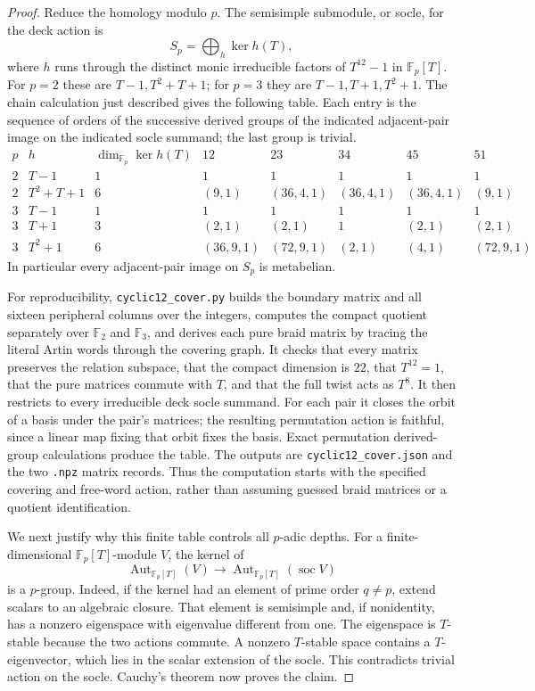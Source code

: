 \begin{proof}
Reduce the homology modulo $p$. The semisimple submodule, or socle,
for the deck action is
\[
 S_p=\bigoplus_h\ker h(T),
\]
where $h$ runs through the distinct monic irreducible factors of
$T^{12}-1$ in $\mathbb F_p[T]$. For $p=2$ these are
$T-1,T^2+T+1$; for $p=3$ they are $T-1,T+1,T^2+1$.
The chain calculation just described gives the following table. Each
entry is the sequence of orders of the successive derived groups of
the indicated adjacent-pair image on the indicated socle summand;
the last group is trivial.
\[
\begin{array}{c|c|c|ccccc}
 p&h&\dim_{\mathbb F_p}\ker h(T)&12&23&34&45&51\\\hline
2&T-1&1&1&1&1&1&1\\
2&T^2+T+1&6&(9,1)&(36,4,1)&(36,4,1)&(36,4,1)&(9,1)\\
3&T-1&1&1&1&1&1&1\\
3&T+1&3&(2,1)&(2,1)&1&(2,1)&(2,1)\\
3&T^2+1&6&(36,9,1)&(72,9,1)&(2,1)&(4,1)&(72,9,1)
\end{array}
\]
In particular every adjacent-pair image on $S_p$ is metabelian.

For reproducibility, \texttt{cyclic12\_cover.py} builds the boundary
matrix and all sixteen peripheral columns over the integers, computes
the compact quotient separately over $\mathbb F_2$ and $\mathbb F_3$,
and derives each pure braid matrix by tracing the literal Artin words
through the covering graph. It checks that every matrix preserves the
relation subspace, that the compact dimension is $22$, that $T^{12}=1$,
that the pure matrices commute with $T$, and that the full twist acts
as $T^8$. It then restricts to every irreducible deck socle summand.
For each pair it closes the orbit of a basis under the pair's matrices;
the resulting permutation action is faithful, since a linear map
fixing that orbit fixes the basis. Exact permutation derived-group
calculations produce the table. The outputs are
\texttt{cyclic12\_cover.json} and the two \texttt{.npz} matrix records.
Thus the computation starts with the specified covering and free-word
action, rather than assuming guessed braid matrices or a quotient
identification.

We next justify why this finite table controls all $p$-adic depths.
For a finite-dimensional $\mathbb F_p[T]$-module $V$, the kernel of
\[
 \operatorname{Aut}_{\mathbb F_p[T]}(V)
 \longrightarrow\operatorname{Aut}_{\mathbb F_p[T]}(\operatorname{soc}V)
\]
is a $p$-group. Indeed, if the kernel had an element of prime order
$q\ne p$, extend scalars to an algebraic closure. That element is
semisimple and, if nonidentity, has a nonzero eigenspace with eigenvalue
different from one. The eigenspace is $T$-stable because the two actions
commute. A nonzero $T$-stable space contains a $T$-eigenvector, which
lies in the scalar extension of the socle. This contradicts trivial
action on the socle. Cauchy's theorem now proves the claim.


\end{proof}
